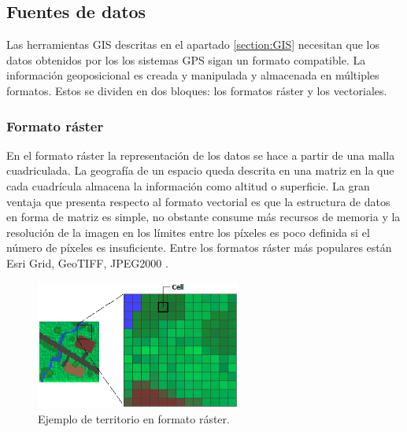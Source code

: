 \subsection{Fuentes de datos}
Las herramientas \ac{GIS} descritas en el apartado \ref{section:GIS} necesitan que los datos obtenidos por los 
los sistemas \ac{GPS} sigan un formato compatible. La información geoposicional es creada y manipulada y 
almacenada en múltiples formatos. Estos se dividen en dos bloques: los formatos ráster y los vectoriales. 

\subsubsection{Formato ráster}
En el formato ráster la representación de los datos se hace a partir de una malla cuadriculada. 
La geografía de un espacio queda descrita en una matriz en la que cada cuadrícula almacena la 
información como altitud o superficie. La gran ventaja que presenta respecto al formato vectorial es que 
la estructura de datos en forma de matriz es simple, no obstante consume más recursos de memoria y la 
resolución de la imagen en los límites entre los píxeles es poco definida si el número de píxeles es insuficiente.
Entre los formatos ráster más populares están Esri Grid, GeoTIFF, JPEG2000 \cite{Morales01}.

\begin{figure}[htb]
\begin{center}
\includegraphics[width=0.6\textwidth]{./Imagenes/RasterImage.png}
\caption{Ejemplo de territorio en formato ráster. \cite{ArgGis01}}
\label{fig:PointGeneration02}
\end{center}
\end{figure}


